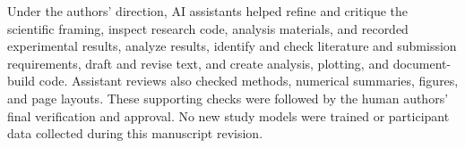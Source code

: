 \documentclass{article}
\begin{document}
Under the authors' direction, AI assistants helped refine and critique the scientific framing, inspect research code, analysis materials, and recorded experimental results, analyze results, identify and check literature and submission requirements, draft and revise text, and create analysis, plotting, and document-build code. Assistant reviews also checked methods, numerical summaries, figures, and page layouts. These supporting checks were followed by the human authors' final verification and approval. No new study models were trained or participant data collected during this manuscript revision.


\clearpage
\appendix

\end{document}
